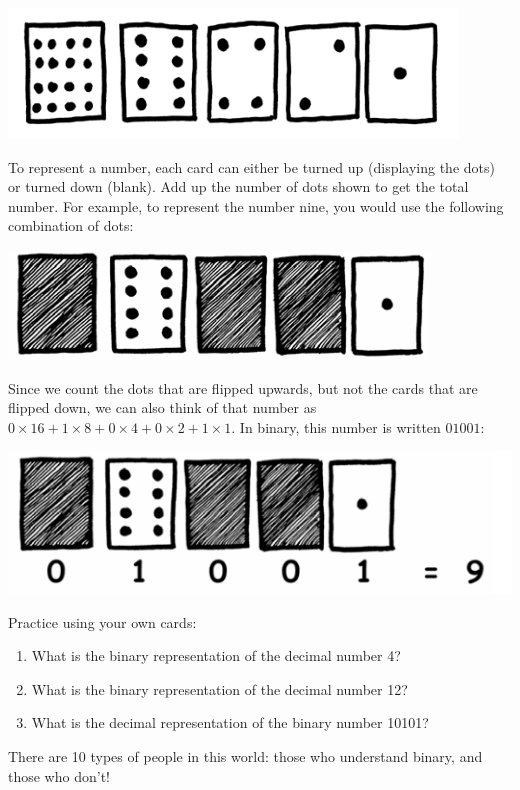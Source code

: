 \documentclass{article}
\begin{document}
\begin{minipage}{\textwidth}
\centering
\includegraphics[width=.7\textwidth]{dots}
\end{minipage}
To represent a number, each card can either be turned up (displaying the dots)
or turned down (blank). Add up the number of dots shown to get the total number.
For example, to represent the number nine, you would use the following
combination of dots:

\begin{minipage}{\textwidth}
\centering
\includegraphics[width=.7\textwidth]{dots9}
\end{minipage}
Since we count the dots that are flipped upwards, but not the cards that are
flipped down, we can also think of that number as $0\times16 + 1\times8 +
0\times4 + 0\times2 + 1\times1$. In binary, this number is written $01001$:

\begin{minipage}{\textwidth}
\centering
\includegraphics[width=.7\textwidth]{dots9'}
\end{minipage}

Practice using your own cards:
\begin{enumerate}
    \item What is the binary representation of the decimal number 4? %
    \item What is the binary representation of the decimal number 12? %
    \item What is the decimal representation of the binary number 10101? %
\end{enumerate}
There are 10 types of people in this world: those who understand binary, and
those who don't!
\end{document}

